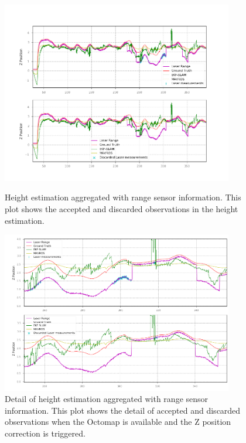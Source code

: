 \begin{figure}
    \centering
    \includegraphics[width=0.9\textwidth]{Images/fig23-laser.png}
    \caption[Height estimation aggregated with range sensor information]{Height estimation aggregated with range sensor information. This plot shows the accepted and discarded observations in the height estimation.}
    \label{fig:chapter3:simulation:c:range-sensor}
    \centering
    \includegraphics[width=0.9\textwidth]{Images/fig23-laser-detail.png}
    \caption[Detail of height estimation aggregated with range sensor information]{Detail of height estimation aggregated with range sensor information. This plot shows the detail of accepted and discarded observations when the Octomap is available and the Z position correction is triggered.}
    \label{fig:chapter3:simulation:c:range-sensor-detail}
\end{figure}

